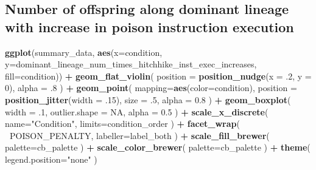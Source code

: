 \documentclass[]{book}
\newenvironment{Shaded}{\begin{snugshade}}{\end{snugshade}}
\newcommand{\DataTypeTok}[1]{\textcolor[rgb]{0.13,0.29,0.53}{#1}}
\newcommand{\DecValTok}[1]{\textcolor[rgb]{0.00,0.00,0.81}{#1}}
\newcommand{\FloatTok}[1]{\textcolor[rgb]{0.00,0.00,0.81}{#1}}
\newcommand{\KeywordTok}[1]{\textcolor[rgb]{0.13,0.29,0.53}{\textbf{#1}}}
\newcommand{\NormalTok}[1]{#1}
\newcommand{\OperatorTok}[1]{\textcolor[rgb]{0.81,0.36,0.00}{\textbf{#1}}}
\newcommand{\OtherTok}[1]{\textcolor[rgb]{0.56,0.35,0.01}{#1}}
\newcommand{\StringTok}[1]{\textcolor[rgb]{0.31,0.60,0.02}{#1}}
\begin{document}
\hypertarget{number-of-offspring-along-dominant-lineage-with-increase-in-poison-instruction-execution}{%
\subsection{Number of offspring along dominant lineage with increase in poison instruction execution}\label{number-of-offspring-along-dominant-lineage-with-increase-in-poison-instruction-execution}}

\begin{Shaded}
\begin{Highlighting}[]
\KeywordTok{ggplot}\NormalTok{(summary_data, }\KeywordTok{aes}\NormalTok{(}\DataTypeTok{x=}\NormalTok{condition, }\DataTypeTok{y=}\NormalTok{dominant_lineage_num_times_hitchhike_inst_exec_increases, }\DataTypeTok{fill=}\NormalTok{condition)) }\OperatorTok{+}
\StringTok{  }\KeywordTok{geom_flat_violin}\NormalTok{(}
    \DataTypeTok{position =} \KeywordTok{position_nudge}\NormalTok{(}\DataTypeTok{x =} \FloatTok{.2}\NormalTok{, }\DataTypeTok{y =} \DecValTok{0}\NormalTok{),}
    \DataTypeTok{alpha =} \FloatTok{.8}
\NormalTok{  ) }\OperatorTok{+}
\StringTok{  }\KeywordTok{geom_point}\NormalTok{(}
    \DataTypeTok{mapping=}\KeywordTok{aes}\NormalTok{(}\DataTypeTok{color=}\NormalTok{condition),}
    \DataTypeTok{position =} \KeywordTok{position_jitter}\NormalTok{(}\DataTypeTok{width =} \FloatTok{.15}\NormalTok{),}
    \DataTypeTok{size =} \FloatTok{.5}\NormalTok{,}
    \DataTypeTok{alpha =} \FloatTok{0.8}
\NormalTok{  ) }\OperatorTok{+}
\StringTok{  }\KeywordTok{geom_boxplot}\NormalTok{(}
    \DataTypeTok{width =} \FloatTok{.1}\NormalTok{,}
    \DataTypeTok{outlier.shape =} \OtherTok{NA}\NormalTok{,}
    \DataTypeTok{alpha =} \FloatTok{0.5}
\NormalTok{  ) }\OperatorTok{+}
\StringTok{  }\KeywordTok{scale_x_discrete}\NormalTok{(}
    \DataTypeTok{name=}\StringTok{"Condition"}\NormalTok{,}
    \DataTypeTok{limits=}\NormalTok{condition_order}
\NormalTok{  ) }\OperatorTok{+}
\StringTok{  }\KeywordTok{facet_wrap}\NormalTok{(}
    \OperatorTok{~}\NormalTok{POISON_PENALTY,}
    \DataTypeTok{labeller=}\NormalTok{label_both}
\NormalTok{  ) }\OperatorTok{+}
\StringTok{  }\KeywordTok{scale_fill_brewer}\NormalTok{(}
    \DataTypeTok{palette=}\NormalTok{cb_palette}
\NormalTok{  ) }\OperatorTok{+}
\StringTok{  }\KeywordTok{scale_color_brewer}\NormalTok{(}
    \DataTypeTok{palette=}\NormalTok{cb_palette}
\NormalTok{  ) }\OperatorTok{+}
\StringTok{  }\KeywordTok{theme}\NormalTok{(}
    \DataTypeTok{legend.position=}\StringTok{"none"}
\NormalTok{  )}
\end{Highlighting}
\end{Shaded}
\end{document}
